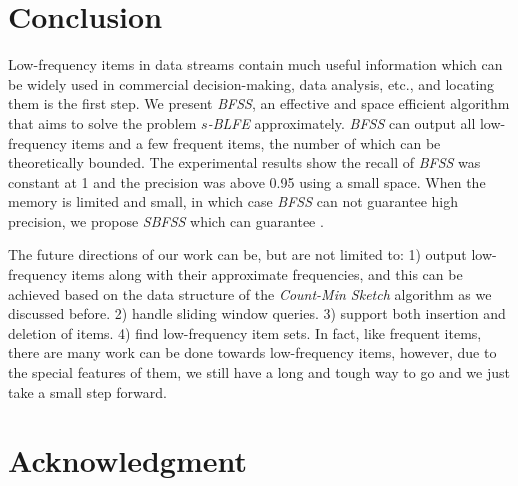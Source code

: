\documentclass[conference]{IEEEtran}
\begin{document}
\section{Conclusion}
Low-frequency items in data streams contain much useful information which can be widely used in commercial decision-making, data analysis, etc., and locating them is the first step. We present \emph{BFSS}, an effective and space efficient algorithm that aims to solve the problem \emph{$s$-BLFE} approximately. \emph{BFSS} can output all low-frequency items and a few frequent items, the number of which can be theoretically bounded. The experimental results show the recall of \emph{BFSS} was constant at 1 and the precision was above 0.95 using a small space. When the memory is limited and small, in which case \emph{BFSS} can not guarantee high precision, we propose \emph{SBFSS} which can guarantee . \par
The future directions of our work can be, but are not limited to: 1) output low-frequency items along with their approximate frequencies, and this can be achieved based on the data structure of the \emph{Count-Min Sketch} algorithm as we discussed before. 2) handle sliding window queries. 3) support both insertion and deletion of items. 4) find low-frequency item sets. In fact, like frequent items, there are many work can be done towards low-frequency items, however, due to the special features of them, we still have a long and tough way to go and we just take a small step forward.








\section*{Acknowledgment}







%
%
%









\end{document}
